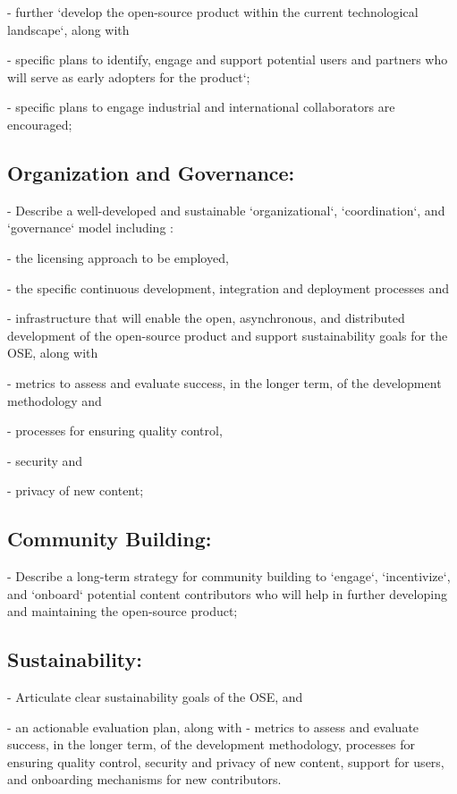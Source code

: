     - further `develop the open-source product within the current technological landscape`, along with
  
  - specific plans to identify, engage and support potential users and partners who will serve as early adopters for the product`; 
  
  - specific plans to engage industrial and international collaborators are encouraged; 

\subsection{Organization and Governance: }
  - Describe a well-developed and sustainable `organizational`, `coordination`, and `governance` model including :
  
    - the licensing approach to be employed, 
    
    - the specific continuous development, integration and deployment processes and 
    
    - infrastructure that will enable the open, asynchronous, and distributed development of the open-source product and support sustainability goals for the OSE, along with 
    
    - metrics to assess and evaluate success, in the longer term, of the development methodology and 
    
    - processes for ensuring quality control, 
    
    - security and
    
    - privacy of new content;
    
\subsection{Community Building: }
- Describe a long-term strategy for community building to `engage`, `incentivize`, and `onboard` potential content contributors who will help in further developing and maintaining the open-source product;

\subsection{Sustainability: }
- Articulate clear sustainability goals of the OSE, and 

  - an actionable evaluation plan, along with 
    - metrics to assess and evaluate success, in the longer term, of the development methodology, processes for ensuring quality control, security and privacy of new content, support for users, and onboarding mechanisms for new contributors.



